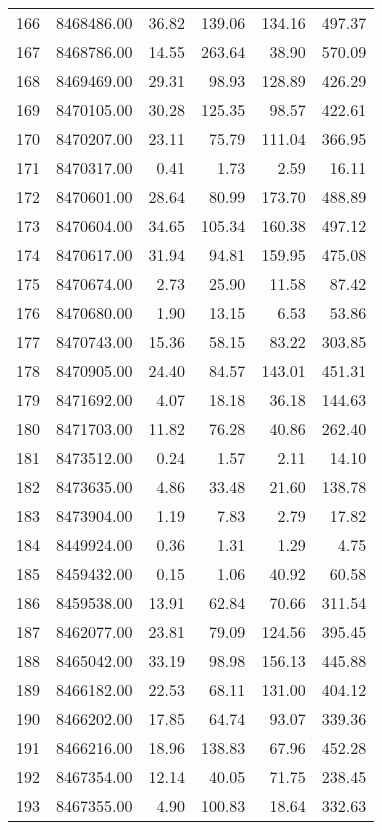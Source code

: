 \begin{table}[ht]
\begin{tabular}{rrrrrr}
  166 & 8468486.00 & 36.82 & 139.06 & 134.16 & 497.37 \\ 
  167 & 8468786.00 & 14.55 & 263.64 & 38.90 & 570.09 \\ 
  168 & 8469469.00 & 29.31 & 98.93 & 128.89 & 426.29 \\ 
  169 & 8470105.00 & 30.28 & 125.35 & 98.57 & 422.61 \\ 
  170 & 8470207.00 & 23.11 & 75.79 & 111.04 & 366.95 \\ 
  171 & 8470317.00 & 0.41 & 1.73 & 2.59 & 16.11 \\ 
  172 & 8470601.00 & 28.64 & 80.99 & 173.70 & 488.89 \\ 
  173 & 8470604.00 & 34.65 & 105.34 & 160.38 & 497.12 \\ 
  174 & 8470617.00 & 31.94 & 94.81 & 159.95 & 475.08 \\ 
  175 & 8470674.00 & 2.73 & 25.90 & 11.58 & 87.42 \\ 
  176 & 8470680.00 & 1.90 & 13.15 & 6.53 & 53.86 \\ 
  177 & 8470743.00 & 15.36 & 58.15 & 83.22 & 303.85 \\ 
  178 & 8470905.00 & 24.40 & 84.57 & 143.01 & 451.31 \\ 
  179 & 8471692.00 & 4.07 & 18.18 & 36.18 & 144.63 \\ 
  180 & 8471703.00 & 11.82 & 76.28 & 40.86 & 262.40 \\ 
  181 & 8473512.00 & 0.24 & 1.57 & 2.11 & 14.10 \\ 
  182 & 8473635.00 & 4.86 & 33.48 & 21.60 & 138.78 \\ 
  183 & 8473904.00 & 1.19 & 7.83 & 2.79 & 17.82 \\ 
  184 & 8449924.00 & 0.36 & 1.31 & 1.29 & 4.75 \\ 
  185 & 8459432.00 & 0.15 & 1.06 & 40.92 & 60.58 \\ 
  186 & 8459538.00 & 13.91 & 62.84 & 70.66 & 311.54 \\ 
  187 & 8462077.00 & 23.81 & 79.09 & 124.56 & 395.45 \\ 
  188 & 8465042.00 & 33.19 & 98.98 & 156.13 & 445.88 \\ 
  189 & 8466182.00 & 22.53 & 68.11 & 131.00 & 404.12 \\ 
  190 & 8466202.00 & 17.85 & 64.74 & 93.07 & 339.36 \\ 
  191 & 8466216.00 & 18.96 & 138.83 & 67.96 & 452.28 \\ 
  192 & 8467354.00 & 12.14 & 40.05 & 71.75 & 238.45 \\ 
  193 & 8467355.00 & 4.90 & 100.83 & 18.64 & 332.63 \\ 

\end{tabular}
\end{table}
